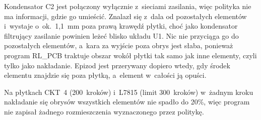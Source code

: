 Kondensator C2 jest połączony wyłącznie z~sieciami zasilania, więc
polityka nie ma informacji, gdzie go umieścić. Znalazł się z~dala od
pozostałych elementów i~wystaje o~ok.~1,1~mm poza prawą krawędź płytki,
choć jako kondensator filtrujący zasilanie powinien leżeć blisko
układu U1. Nic nie przyciąga go do pozostałych elementów, a~kara za
wyjście poza obrys jest słaba, ponieważ program RL\_PCB traktuje obszar
wokół płytki tak samo jak inne elementy, czyli tylko jako nakładanie.
Epizod jest przerywany dopiero wtedy, gdy środek elementu znajdzie się
poza płytką, a~element w~całości ją opuści.

Na płytkach CKT~4 (200~kroków) i~L7815 (limit 300~kroków) w~żadnym
kroku nakładanie się obrysów wszystkich elementów nie spadło do 20\%,
więc program nie zapisał żadnego rozmieszczenia wyznaczonego przez
politykę.
